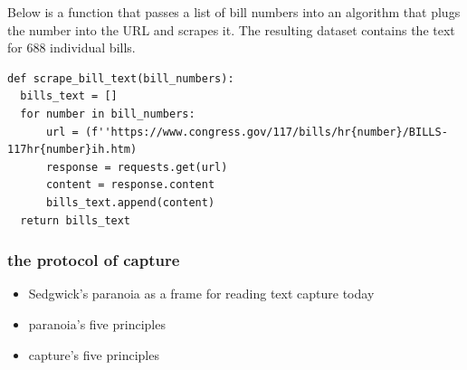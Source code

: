 \documentclass[11pt]{article}
\begin{document}
\begin{enumerate}
Below is a function that passes a list of bill numbers into an
algorithm that plugs the number into the URL and scrapes it. The
resulting dataset contains the text for 688 individual bills.

\begin{verbatim}
def scrape_bill_text(bill_numbers):
  bills_text = []
  for number in bill_numbers:
      url = (f''https://www.congress.gov/117/bills/hr{number}/BILLS-117hr{number}ih.htm)
      response = requests.get(url)
      content = response.content
      bills_text.append(content)
  return bills_text
\end{verbatim}
\end{enumerate}

\subsubsection{the protocol of capture}
\label{sec:org9cf2cef}
\begin{itemize}
\item Sedgwick's paranoia as a frame for reading text capture today
\item paranoia's five principles
\item capture's five principles
\end{itemize}
\end{document}
